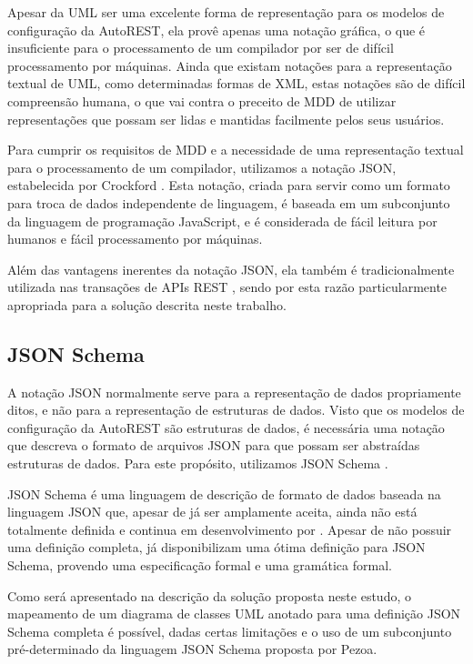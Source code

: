 Apesar da UML ser uma excelente forma de representação para os modelos de configuração da AutoREST, ela provê apenas uma notação gráfica, o que é insuficiente para o processamento de um compilador por ser de difícil processamento por máquinas. Ainda que existam notações para a representação textual de UML, como determinadas formas de XML, estas notações são de difícil compreensão humana, o que vai contra o preceito de MDD de utilizar representações que possam ser lidas e mantidas facilmente pelos seus usuários.

Para cumprir os requisitos de MDD e a necessidade de uma representação textual para o processamento de um compilador, utilizamos a notação JSON, estabelecida por Crockford \cite{JSON:2016} \cite{RFC4627} \cite{ECMA404}. Esta notação, criada para servir como um formato para troca de dados independente de linguagem, é baseada em um subconjunto da linguagem de programação JavaScript, e é considerada de fácil leitura por humanos e fácil processamento por máquinas.

Além das vantagens inerentes da notação JSON, ela também é tradicionalmente utilizada nas transações de APIs REST \cite{PEZOA:2016} \cite{POLAK:2015}, sendo por esta razão particularmente apropriada para a solução descrita neste trabalho.


\subsection{JSON Schema}

A notação JSON normalmente serve para a representação de dados propriamente ditos, e não para a representação de estruturas de dados. Visto que os modelos de configuração da AutoREST são estruturas de dados, é necessária uma notação que descreva o formato de arquivos JSON para que possam ser abstraídas estruturas de dados. Para este propósito, utilizamos JSON Schema \cite{GALIEGUE:2013}.

JSON Schema é uma linguagem de descrição de formato de dados baseada na linguagem JSON que, apesar de já ser amplamente aceita, ainda não está totalmente definida e continua em desenvolvimento por . Apesar de não possuir uma definição completa,  já disponibilizam uma ótima definição para JSON Schema, provendo uma especificação formal e uma gramática formal.

Como será apresentado na descrição da solução proposta neste estudo, o mapeamento de um diagrama de classes UML anotado para uma definição JSON Schema completa é possível, dadas certas limitações e o uso de um subconjunto pré-determinado da linguagem JSON Schema proposta por Pezoa.
